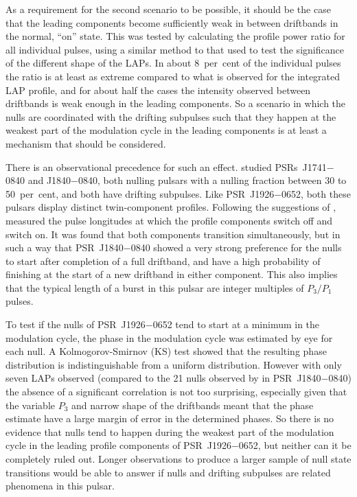 As a requirement for the second scenario to be possible, it should be the case that the leading components become sufficiently weak in between driftbands in the normal, ``on'' state. This was tested by calculating the profile power ratio for all individual pulses, using a similar method to that used to test the significance of the different shape of the LAPs. In about 8~per~cent of the individual pulses the ratio is at least as extreme compared to what is observed for the integrated LAP profile, and for about half the cases the intensity observed between driftbands is weak enough in the leading components. So a scenario in which the nulls are coordinated with the drifting subpulses such that they happen at the weakest part of the modulation cycle in the leading components is at least a mechanism that should be considered.

There is an observational precedence for such an effect. \citet{GYY+2017} studied PSRs~J1741$-$0840 and J1840$-$0840, both nulling pulsars with a nulling fraction between 30 to 50~per~cent, and both have drifting subpulses. Like PSR~J1926$-$0652, both these pulsars display distinct twin-component profiles. Following the suggestions of \citet{JVxx2000}, \citet{GYY+2017} measured the pulse longitudes at which the profile components switch off and switch on. It was found that both components transition simultaneously, but in such a way that PSR~J1840$-$0840 showed a very strong preference for the nulls to start after completion of a full driftband, and have a high probability of finishing at the start of a new driftband in either component. This also implies that the typical length of a burst in this pulsar are integer multiples of $P_3/P_1$ pulses.

To test if the nulls of PSR~J1926$-$0652 tend to start at a minimum in the modulation cycle, the phase in the modulation cycle was estimated by eye for each null. A Kolmogorov-Smirnov (KS) test showed that the resulting phase distribution is indistinguishable from a uniform distribution. However with only seven LAPs observed (compared to the 21 nulls observed by \citealt{GYY+2017} in PSR~J1840$-$0840) the absence of a significant correlation is not too surprising, especially given that the variable $P_3$ and narrow shape of the driftbands meant that the phase estimate have a large margin of error in the determined phases. So there is no evidence that nulls tend to happen during the weakest part of the modulation cycle in the leading profile components of PSR~J1926$-$0652, but neither can it be completely ruled out. Longer observations to produce a larger sample of null state transitions would be able to answer if nulls and drifting subpulses are related phenomena in this pulsar. 

